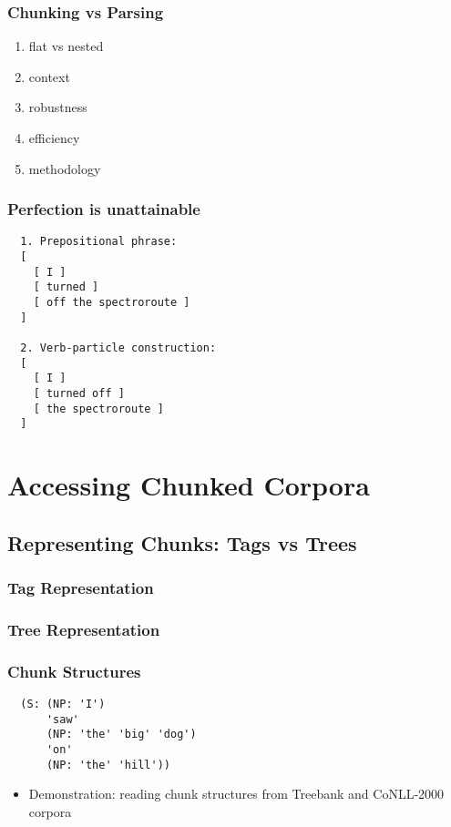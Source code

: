 \documentclass{beamer}             %
\begin{document}
\begin{frame}
  \frametitle{Chunking vs Parsing}
  \begin{enumerate}
  \item flat vs nested
  \item context
  \item robustness
  \item efficiency
  \item methodology
  \end{enumerate}
\end{frame}

\begin{frame}[fragile]
  \frametitle{Perfection is unattainable}

\begin{verbatim}
  1. Prepositional phrase:
  [
    [ I ]
    [ turned ]
    [ off the spectroroute ]
  ]

  2. Verb-particle construction:
  [
    [ I ]
    [ turned off ]
    [ the spectroroute ]
  ]
\end{verbatim}
\end{frame}


\section{Accessing Chunked Corpora}

\subsection{Representing Chunks: Tags vs Trees}

\begin{frame}
  \frametitle{Tag Representation}
  \centerline{}
\end{frame}

\begin{frame}
  \frametitle{Tree Representation}
  \centerline{}
\end{frame}

\begin{frame}[fragile]
  \frametitle{Chunk Structures}
\begin{verbatim}
  (S: (NP: 'I')
      'saw'
      (NP: 'the' 'big' 'dog')
      'on'
      (NP: 'the' 'hill'))
\end{verbatim}
  \begin{itemize}
  \item Demonstration: reading chunk structures from Treebank and CoNLL-2000 corpora
  \end{itemize}
\end{frame}
\end{document}
